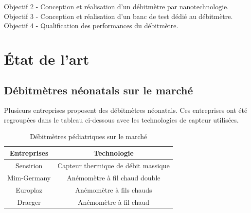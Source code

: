 Objectif 2 - Conception et réalisation d'un débitmètre par nanotechnologie. \\

Objectif 3 - Conception et réalisation d'un banc de test dédié au débitmètre.\\

Objectif 4 - Qualification des performances du débitmètre.

\section{État de l'art}
\subsection{Débitmètres néonatals sur le marché}

Plusieurs entreprises proposent des débitmètres néonatals. Ces entreprises ont été regroupées dans le tableau ci-dessous avec les 
technologies de capteur utilisées. \\

\begin{table}[H]
    \centering
    \begin{tabular}{|c|c|}
        \hline
        \textbf{Entreprises} & \textbf{Technologie}                \\
        \hline
        Sensirion            & Capteur thermique de débit massique \\
        \hline
        Mim-Germany          & Anémomètre à fil chaud double       \\
        \hline
        Europlaz             & Anémomètre à fils chauds            \\
        \hline
        Draeger              & Anémomètre à fil chaud              \\
        \hline
    \end{tabular}
    \caption{Débitmètres pédiatriques sur le marché}
    \label{tab:debitmetreMarche}
\end{table}


